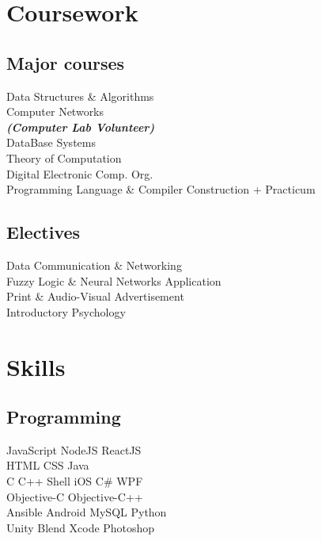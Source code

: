 \documentclass[]{deedy-resume-openfont}
\begin{document}
\begin{minipage}[t]{0.33\textwidth}

\section{Coursework}


\subsection{Major courses}
Data Structures \& Algorithms \\
Computer Networks \\
{\footnotesize \textit{\textbf{(Computer Lab Volunteer) }}} \\
DataBase Systems \\
Theory of Computation \\
Digital Electronic Comp. Org. \\
Programming Language \& Compiler Construction + Practicum\\
\sectionsep

\subsection{Electives}
Data Communication \& Networking \\
Fuzzy Logic \& Neural Networks Application \\
Print \& Audio-Visual Advertisement \\
Introductory Psychology \\
\sectionsep


\section{Skills}
\subsection{Programming}
JavaScript \textbullet{} NodeJS \textbullet{} ReactJS\\ 
 \textbullet{} HTML \textbullet{} CSS \textbullet{} Java  \\ 
C \textbullet{} C++ \textbullet{} Shell \textbullet{} iOS \textbullet{} C\#\textbullet{} WPF\\
Objective-C \textbullet{} Objective-C++ \\
Ansible  \textbullet{} Android \textbullet{} MySQL\textbullet{} Python\\
Unity \textbullet{} Blend \textbullet{} Xcode \textbullet{} Photoshop
\sectionsep

%
%

\end{minipage} 
\end{document}
